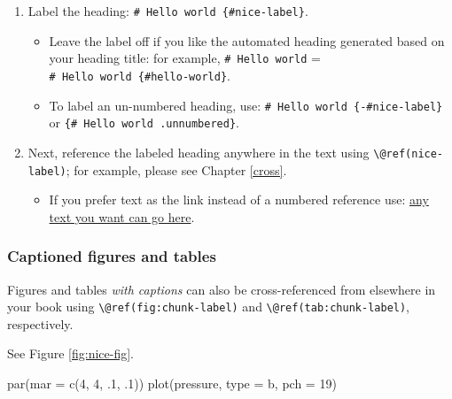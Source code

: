 \documentclass[
]{bxjsbook}
\newenvironment{Shaded}{\begin{snugshade}}{\end{snugshade}}
\newcommand{\AttributeTok}[1]{\textcolor[rgb]{0.77,0.63,0.00}{#1}}
\newcommand{\DecValTok}[1]{\textcolor[rgb]{0.00,0.00,0.81}{#1}}
\newcommand{\FunctionTok}[1]{\textcolor[rgb]{0.00,0.00,0.00}{#1}}
\newcommand{\NormalTok}[1]{#1}
\newcommand{\StringTok}[1]{\textcolor[rgb]{0.31,0.60,0.02}{#1}}
\providecommand{\tightlist}{%
  \setlength{\itemsep}{0pt}\setlength{\parskip}{0pt}}
\theoremstyle{definition}
\theoremstyle{definition}
\theoremstyle{definition}
\theoremstyle{definition}
\theoremstyle{remark}
\begin{document}
\begin{enumerate}
\def\labelenumi{\arabic{enumi}.}
\tightlist
\item
  Label the heading: \texttt{\#\ Hello\ world\ \{\#nice-label\}}.

  \begin{itemize}
  \tightlist
  \item
    Leave the label off if you like the automated heading generated based on your heading title: for example, \texttt{\#\ Hello\ world} = \texttt{\#\ Hello\ world\ \{\#hello-world\}}.
  \item
    To label an un-numbered heading, use: \texttt{\#\ Hello\ world\ \{-\#nice-label\}} or \texttt{\{\#\ Hello\ world\ .unnumbered\}}.
  \end{itemize}
\item
  Next, reference the labeled heading anywhere in the text using \texttt{\textbackslash{}@ref(nice-label)}; for example, please see Chapter \ref{cross}.

  \begin{itemize}
  \tightlist
  \item
    If you prefer text as the link instead of a numbered reference use: \protect\hyperlink{cross}{any text you want can go here}.
  \end{itemize}
\end{enumerate}

\hypertarget{captioned-figures-and-tables}{%
\subsubsection{Captioned figures and tables}\label{captioned-figures-and-tables}}

Figures and tables \emph{with captions} can also be cross-referenced from elsewhere in your book using \texttt{\textbackslash{}@ref(fig:chunk-label)} and \texttt{\textbackslash{}@ref(tab:chunk-label)}, respectively.

See Figure \ref{fig:nice-fig}.

\begin{Shaded}
\begin{Highlighting}[]
\FunctionTok{par}\NormalTok{(}\AttributeTok{mar =} \FunctionTok{c}\NormalTok{(}\DecValTok{4}\NormalTok{, }\DecValTok{4}\NormalTok{, .}\DecValTok{1}\NormalTok{, .}\DecValTok{1}\NormalTok{))}
\FunctionTok{plot}\NormalTok{(pressure, }\AttributeTok{type =} \StringTok{\textquotesingle{}b\textquotesingle{}}\NormalTok{, }\AttributeTok{pch =} \DecValTok{19}\NormalTok{)}
\end{Highlighting}
\end{Shaded}
\end{document}
